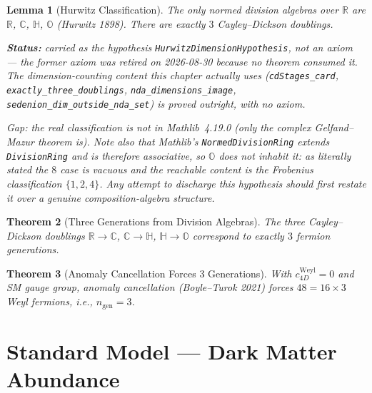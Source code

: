 \documentclass{report}
\newtheorem{theorem}{Theorem}[chapter]
\newtheorem{lemma}[theorem]{Lemma}
\theoremstyle{definition}
\begin{document}
\begin{lemma}[Hurwitz Classification]
  \label{lem:hurwitz}
  The only normed division algebras over $\mathbb{R}$ are
  $\mathbb{R}$, $\mathbb{C}$, $\mathbb{H}$, $\mathbb{O}$
  (Hurwitz 1898).  There are exactly $3$ Cayley--Dickson doublings.

  \textbf{Status:} carried as the \emph{hypothesis} \texttt{HurwitzDimensionHypothesis},
  not an axiom --- the former axiom was retired on 2026-08-30 because no theorem
  consumed it. The dimension-counting content this chapter actually uses
  (\texttt{cdStages\_card}, \texttt{exactly\_three\_doublings},
  \texttt{nda\_dimensions\_image}, \texttt{sedenion\_dim\_outside\_nda\_set})
  is proved outright, with no axiom.

  Gap: the real classification is not in Mathlib~4.19.0 (only the \emph{complex}
  Gelfand--Mazur theorem is). Note also that Mathlib's \texttt{NormedDivisionRing}
  extends \texttt{DivisionRing} and is therefore associative, so $\mathbb{O}$ does not
  inhabit it: as literally stated the $8$ case is vacuous and the reachable content is
  the Frobenius classification $\{1,2,4\}$. Any attempt to discharge this hypothesis
  should first restate it over a genuine composition-algebra structure.
\end{lemma}

\begin{theorem}[Three Generations from Division Algebras]
  \label{cor:three-generations-anomaly}
  The three Cayley--Dickson doublings $\mathbb{R}\to\mathbb{C}$,
  $\mathbb{C}\to\mathbb{H}$, $\mathbb{H}\to\mathbb{O}$
  correspond to exactly $3$ fermion generations.
\end{theorem}

\begin{theorem}[Anomaly Cancellation Forces 3 Generations]
  \label{thm:anomaly-cancel}
  With $c_{4D}^{\mathrm{Weyl}} = 0$ and SM gauge group,
  anomaly cancellation (Boyle--Turok 2021) forces
  $48 = 16 \times 3$ Weyl fermions, i.e., $n_{\mathrm{gen}} = 3$.
\end{theorem}

\chapter{Standard Model --- Dark Matter Abundance}
\end{document}

